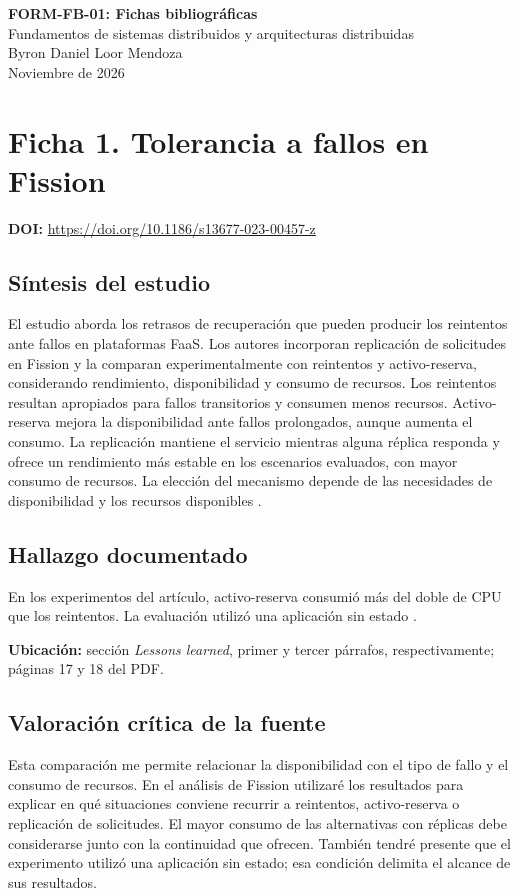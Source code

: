 \documentclass[11pt,a4paper]{article}
\newcommand{\tituloficha}[1]{\Needspace{5\baselineskip}\section*{#1}}
\newcommand{\doificha}[1]{\textbf{DOI:} \url{https://doi.org/#1}\par}
\begin{document}
\begin{center}
    {\large\bfseries FORM-FB-01: Fichas bibliográficas}\\[3pt]
    Fundamentos de sistemas distribuidos
    y arquitecturas distribuidas\\[3pt]
    Byron Daniel Loor Mendoza\\
    Noviembre de 2026
\end{center}

\tituloficha{Ficha 1. Tolerancia a fallos en Fission}

\doificha{10.1186/s13677-023-00457-z}

\subsection*{Síntesis del estudio}

El estudio aborda los retrasos de recuperación que pueden producir los
reintentos ante fallos en plataformas FaaS. Los autores incorporan
replicación de solicitudes en Fission y la comparan experimentalmente con
reintentos y activo-reserva, considerando rendimiento, disponibilidad y
consumo de recursos. Los reintentos resultan apropiados para fallos
transitorios y consumen menos recursos. Activo-reserva mejora la
disponibilidad ante fallos prolongados, aunque aumenta el consumo. La
replicación mantiene el servicio mientras alguna réplica responda y ofrece
un rendimiento más estable en los escenarios evaluados, con mayor consumo de
recursos. La elección del mecanismo depende de las necesidades de
disponibilidad y los recursos disponibles
\cite{bouizem_integrating_2023}.

\subsection*{Hallazgo documentado}

En los experimentos del artículo, activo-reserva consumió
más del doble de CPU que los reintentos.
La evaluación utilizó una aplicación sin estado
\cite{bouizem_integrating_2023}.

\textbf{Ubicación:} sección \textit{Lessons learned},
primer y tercer párrafos, respectivamente; páginas 17 y 18 del PDF.

\subsection*{Valoración crítica de la fuente}

Esta comparación me permite relacionar la disponibilidad con el tipo de
fallo y el consumo de recursos. En el análisis de Fission utilizaré los
resultados para explicar en qué situaciones conviene recurrir a reintentos,
activo-reserva o replicación de solicitudes. El mayor consumo de las
alternativas con réplicas debe considerarse junto con la continuidad que
ofrecen. También tendré presente que el experimento utilizó una aplicación
sin estado; esa condición delimita el alcance de sus resultados.
\end{document}
